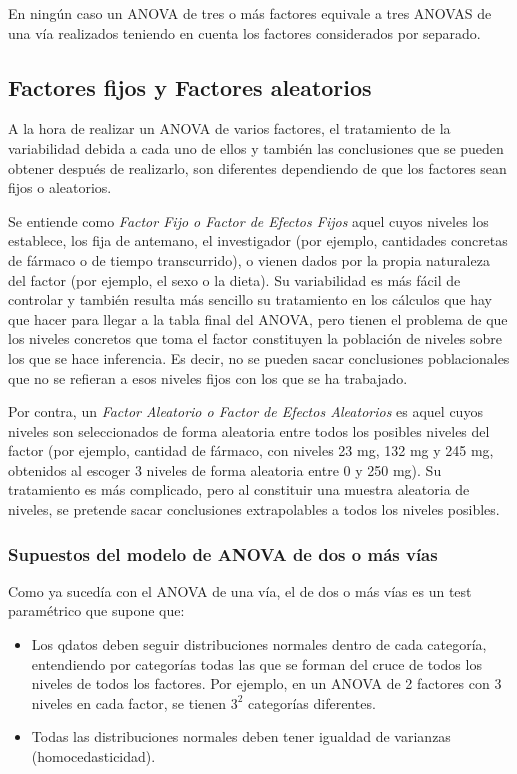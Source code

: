 \documentclass[
  spanish,
  a4paper,
]{scrreport}
\theoremstyle{plain}
\theoremstyle{definition}
\theoremstyle{definition}
\theoremstyle{remark}
\begin{document}
En ningún caso un ANOVA de tres o más factores equivale a tres ANOVAS de
una vía realizados teniendo en cuenta los factores considerados por
separado.

\subsection{Factores fijos y Factores
aleatorios}\label{factores-fijos-y-factores-aleatorios}

A la hora de realizar un ANOVA de varios factores, el tratamiento de la
variabilidad debida a cada uno de ellos y también las conclusiones que
se pueden obtener después de realizarlo, son diferentes dependiendo de
que los factores sean fijos o aleatorios.

Se entiende como \emph{Factor Fijo o Factor de Efectos Fijos} aquel
cuyos niveles los establece, los fija de antemano, el investigador (por
ejemplo, cantidades concretas de fármaco o de tiempo transcurrido), o
vienen dados por la propia naturaleza del factor (por ejemplo, el sexo o
la dieta). Su variabilidad es más fácil de controlar y también resulta
más sencillo su tratamiento en los cálculos que hay que hacer para
llegar a la tabla final del ANOVA, pero tienen el problema de que los
niveles concretos que toma el factor constituyen la población de niveles
sobre los que se hace inferencia. Es decir, no se pueden sacar
conclusiones poblacionales que no se refieran a esos niveles fijos con
los que se ha trabajado.

Por contra, un \emph{Factor Aleatorio o Factor de Efectos Aleatorios} es
aquel cuyos niveles son seleccionados de forma aleatoria entre todos los
posibles niveles del factor (por ejemplo, cantidad de fármaco, con
niveles 23 mg, 132 mg y 245 mg, obtenidos al escoger 3 niveles de forma
aleatoria entre 0 y 250 mg). Su tratamiento es más complicado, pero al
constituir una muestra aleatoria de niveles, se pretende sacar
conclusiones extrapolables a todos los niveles posibles.

\subsubsection{Supuestos del modelo de ANOVA de dos o más
vías}\label{supuestos-del-modelo-de-anova-de-dos-o-muxe1s-vuxedas}

Como ya sucedía con el ANOVA de una vía, el de dos o más vías es un test
paramétrico que supone que:

\begin{itemize}
\item
  Los qdatos deben seguir distribuciones normales dentro de cada
  categoría, entendiendo por categorías todas las que se forman del
  cruce de todos los niveles de todos los factores. Por ejemplo, en un
  ANOVA de 2 factores con 3 niveles en cada factor, se tienen \(3^2\)
  categorías diferentes.
\item
  Todas las distribuciones normales deben tener igualdad de varianzas
  (homocedasticidad).
\end{itemize}
\end{document}
